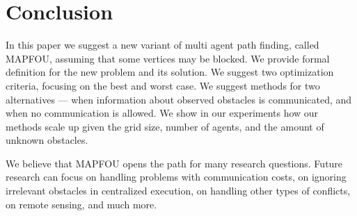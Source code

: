 \documentclass[letterpaper]{article} %
\begin{document}
\section{Conclusion}

In this paper we suggest a new variant of multi agent path finding, called MAPFOU, assuming that some vertices may be blocked. We provide formal definition for the new problem and its solution. We suggest two optimization criteria, focusing on the best and worst case. We suggest methods for two alternatives --- when information about observed obstacles is communicated, and when no communication is allowed. We show in our experiments how our methods scale up given the grid size, number of agents, and the amount of unknown obstacles.

We believe that MAPFOU opens the path for many research questions. Future research can focus on handling problems with communication costs, on ignoring irrelevant obstacles in centralized execution, on handling other types of conflicts, on remote sensing, and much more.



\end{document}
